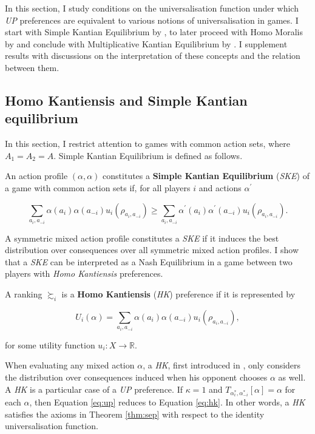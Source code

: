 In this section, I study conditions on the universalisation function under which \textit{UP} preferences are equivalent to various notions of universalisation in games. I start with Simple Kantian Equilibrium by \cite{roemer2019cooperate}, to later proceed with Homo Moralis by \cite{algerHomoMoralisPreference2013} and conclude with Multiplicative Kantian Equilibrium by \cite{roemer2019cooperate}. I supplement results with discussions on the interpretation of these concepts and the relation between them.

\subsection{Homo Kantiensis and Simple Kantian equilibrium}

In this section, I restrict attention to games with common action sets, where \(A_1= A_2 =A\). Simple Kantian Equilibrium is defined as follows.

\begin{definition}\label{definition:ske}
	An action profile \( ( \alpha, \alpha ) \) constitutes a \textbf{Simple Kantian Equilibrium} (\textit{SKE}) of a game with common action sets if, for all players \(i\) and actions \(\alpha^{\prime}\)

	\[
		\sum_{a_i, a_{-i}} \alpha (a_i) \alpha (a_{-i}) u_i(\rho_{a_i, a_{-i}}) \geq  \sum_{a_i, a_{-i}} \alpha^{\prime} (a_i) \alpha^{\prime} (a_{-i}) u_i(\rho_{a_i, a_{-i}}) .
	\]
\end{definition}

A symmetric mixed action profile constitutes a \textit{SKE} if it induces the best distribution over consequences over all symmetric mixed action profiles. I show that a \textit{SKE} can be interpreted as a Nash Equilibrium in a game between two players with \textit{Homo Kantiensis} preferences.

\begin{definition}\label{def:hk}
	A ranking \( \succsim_i \) is a \textbf{Homo Kantiensis} (\textit{HK}) preference if it is represented by

	\begin{equation}\label{eq:hk}
		U_i ( \alpha ) = \sum_{a_i, a_{-i}} \alpha (a_i) \alpha (a_{-i}) u_i(\rho_{a_i, a_{-i}}) ,
	\end{equation}

	for some utility function \(u_i \colon X \rightarrow \mathbb{R}\).
\end{definition}

When evaluating any mixed action \( \alpha \), a \textit{HK}, first introduced in \cite{laffontMacroeconomicConstraintsEconomic1975}, only considers the distribution over consequences induced when his opponent chooses \( \alpha \) as well. A \textit{HK} is a particular case of a \textit{UP} preference. If \( \kappa = 1 \) and \( T_{\alpha^{*}_i, \alpha^{*}_{-i}} [ \alpha ] = \alpha \) for each \( \alpha\), then Equation \eqref{eq:up} reduces to Equation \eqref{eq:hk}. In other words, a \textit{HK} satisfies the axioms in Theorem \ref{thm:sep} with respect to the identity universalisation function.

